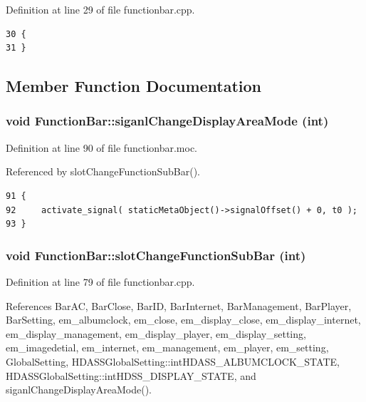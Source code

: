 Definition at line 29 of file functionbar.cpp.



\footnotesize\begin{verbatim}30 {
31 }
\end{verbatim}\normalsize 


\subsection{Member Function Documentation}
\subsubsection{\setlength{\rightskip}{0pt plus 5cm}void Function\-Bar::siganl\-Change\-Display\-Area\-Mode (int)\hspace{0.3cm}{\tt  [signal]}}\label{classFunctionBar_FunctionBarl0}




Definition at line 90 of file functionbar.moc.

Referenced by slot\-Change\-Function\-Sub\-Bar().



\footnotesize\begin{verbatim}91 {
92     activate_signal( staticMetaObject()->signalOffset() + 0, t0 );
93 }
\end{verbatim}\normalsize 
{}
\subsubsection{\setlength{\rightskip}{0pt plus 5cm}void Function\-Bar::slot\-Change\-Function\-Sub\-Bar (int)\hspace{0.3cm}{\tt  [slot]}}\label{classFunctionBar_FunctionBari0}




Definition at line 79 of file functionbar.cpp.

References Bar\-AC, Bar\-Close, Bar\-ID, Bar\-Internet, Bar\-Management, Bar\-Player, Bar\-Setting, em\_\-albumclock, em\_\-close, em\_\-display\_\-close, em\_\-display\_\-internet, em\_\-display\_\-management, em\_\-display\_\-player, em\_\-display\_\-setting, em\_\-imagedetial, em\_\-internet, em\_\-management, em\_\-player, em\_\-setting, Global\-Setting, HDASSGlobal\-Setting::int\-HDASS\_\-ALBUMCLOCK\_\-STATE, HDASSGlobal\-Setting::int\-HDSS\_\-DISPLAY\_\-STATE, and siganl\-Change\-Display\-Area\-Mode().

